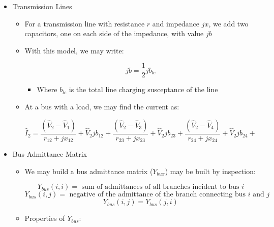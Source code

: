 \begin{itemize}
\begin{itemize}
\begin{itemize}
\begin{itemize}
            \end{itemize}

        \end{itemize}

    \end{itemize}

  \item Transmission Lines

    \begin{itemize}

      \item For a transmission line with resistance $r$ and impedance $jx$, we add two capacitors, one on each side of the impedance, with value $jb$

      \item With this model, we may write:

        $$jb=\frac{1}{2}jb_{lc}$$

        \begin{itemize}

          \item Where $b_{lc}$ is the total line charging susceptance of the line

        \end{itemize}

      \item At a bus with a load, we may find the current as:

        $$\hat{I}_2=\frac{(\hat{V}_2-\hat{V}_1)}{r_{12}+jx_{12}}+\hat{V}_2jb_{12}+\frac{(\hat{V}_2-\hat{V}_3)}{r_{23}+jx_{23}}+\hat{V}_2jb_{23}+\frac{(\hat{V}_2-\hat{V}_4)}{r_{24}+jx_{24}}+\hat{V}_2jb_{24}+$$

    \end{itemize}

  \item Bus Admittance Matrix

    \begin{itemize}

      \item We may build a bus admittance matrix ($Y_{bux}$) may be built by inspection:

        $$Y_{bus}(i,i)=\text{ sum of admittances of all branches incident to bus }i$$
        $$Y_{bus}(i,j)=\text{ negative of the admittance of the branch connecting bus }i\text{ and }j$$
        $$Y_{bus}(i,j)=Y_{bus}(j,i)$$

      \item Properties of $Y_{bus}$:

        \begin{itemize}


\end{itemize}
\end{itemize}
\end{itemize}
